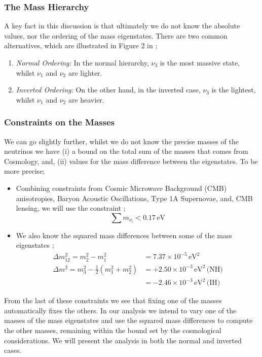 \documentclass[11pt]{article}
\numberwithin{equation}{section}
\numberwithin{figure}{section}
\numberwithin{table}{section}
\begin{document}
\subsubsection{The Mass Hierarchy}

A key fact in this discussion is that ultimately we do not know the absolute values, nor the ordering of the mass eigenstates. There are two common alternatives, which are illustrated in Figure 2 in \cite{King};
\begin{enumerate}
  \item \textit{Normal Ordering:} In the normal hierarchy, $\nu_3$ is the most massive state, whilst $\nu_1$ and $\nu_2$ are lighter.
  \item \textit{Inverted Ordering:} On the other hand, in the inverted case, $\nu_3$ is the lightest, whilst $\nu_1$ and $\nu_2$ are heavier.
\end{enumerate}

\subsubsection{Constraints on the Masses}

We can go slightly further, whilst we do not know the precise masses of the neutrinos we have (i) a bound on the total sum of the masses that comes from Cosmology, and, (ii) values for the mass difference between the eigenstates. To be more precise;
\begin{itemize}
  \item Combining constraints from Cosmic Microwave Background (CMB) anisotropies, Baryon Acoustic Oscillations, Type 1A Supernovae, and, CMB lensing, we will use the constraint \cite{Couchot2017};
  \begin{equation}
    \sum{m_{\nu_i}} < 0.17 \, \textrm{eV}
  \end{equation}
  \item We also know the squared mass differences between some of the mass eigenstates \cite{Couchot2017};
  \begin{align}
    \Delta m_{12}^2 = m_2^2 - m_1^2 &= 7.37 \times 10^{-5}\,\textrm{eV}^2 \\
    \Delta m^2 = m_3^2 - \frac{1}{2}(m_1^2 + m_2^2) &= +2.50 \times 10^{-3} \, \textrm{eV}^2\, \textrm{(NH)} \\
    &= -2.46 \times 10^{-3} \, \textrm{eV}^2\, \textrm{(IH)}
  \end{align}
\end{itemize}
From the last of these constraints we see that fixing one of the masses automatically fixes the others. In our analysis we intend to vary one of the masses of the mass eigenstates and use the squared mass differences to compute the other masses, remaining within the bound set by the cosmological considerations. We will present the analysis in both the normal and inverted cases.
\end{document}

